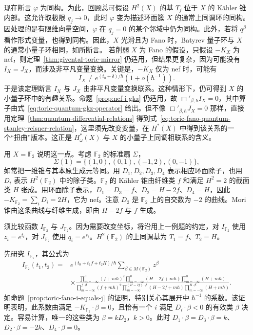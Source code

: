 \begin{example}
现在断言 $\varphi$ 为同构。为此，回顾总可假设 $H^2(X)$ 的基 $T_j$ 位于 $X$ 的 Kähler 锥内部。这允许取极限 $q_j\to0$，此时 $\varphi$ 变为描述环面簇 $X$ 的通常上同调环的同构。因处理的是有限维向量空间，$\varphi$ 在 $q_j=0$ 的某个邻域中仍为同构。此外，若将 $q^\beta$ 看作形式变量，也得到同构。因此，$X$ 光滑且为 Fano 时，Batyrev 量子环与 $X$ 的通常小量子环相同，如所断言。
若削弱 $X$ 为 Fano 的假设，只假设 $-K_X$ 为 nef，则定理~\ref{thm:givental-toric-mirror} 仍适用，但结果更复杂，因为可能没有 $I_X=J_X$，而涉及非平凡变量变换。关键是，$-K_X$ 仅为 nef 时，可能有
\[
I_X\ne e^{(t_0+\delta)/\hbar}(1+o(\hbar^{-1})).
\]
于是该定理断言 $I_X$ 与 $J_X$ 由非平凡变量变换联系。这种情形下，仍可得到 $X$ 的小量子环中的有趣关系。命题~\ref{prop:nef-i-gkz} 仍适用，故 $\Box'_{\beta,\hbar}I_X=0$，其中算子由式~\eqref{eq:toric-quantum-gkz-operator} 给出。但不像 $\Box'_{\beta,\hbar}J_X=0$ 那样，直接用定理~\ref{thm:quantum-differential-relations} 得到式~\eqref{eq:toric-fano-quantum-stanley-reisner-relation}，这里须先改变变量，在 $H^*(X)$ 中得到该关系的一个“扭曲”版本。这正是 $H_\omega^*(X)$ 与 $X$ 的小量子上同调相联系的含义。

\begingroup\linespread{1.18}\selectfont
用 $X=\mathbb F_2$ 说明这一点。考虑 $\mathbb F_2$ 的标准扇 $\Sigma$，
\[
\Sigma(1)=\{(1,0),(0,1),(-1,2),(0,-1)\},
\]
如常把一维锥与其本原生成元等同。用 $D_1,D_2,D_3,D_4$ 表示相应环面除子，也用 $D_i$ 表示 $H^2(\mathbb F_2)$ 中的除子类。$\mathbb F_2$ 的 Kähler 锥由纤维类 $f$ 和满足 $H^2=2$ 的截面类 $H$ 张成。用环面除子表示，$D_1=D_3=f$、$D_2=H-2f$、$D_4=H$，因此 $-K_{\mathbb F_2}=\sum_iD_i=2H$，它为 nef。注意 $D_2$ 是 $\mathbb F_2$ 上的自交数为 $-2$ 的曲线。Mori 锥由这条曲线与纤维生成，即由 $H-2f$ 与 $f$ 生成。

须比较函数 $I_{\mathbb F_2}$ 与 $J_{\mathbb F_2}$。因为需要改变坐标，将沿用上一例题的约定，对 $I_{\mathbb F_2}$ 使用 $z_i=e^{t_i}$，对 $J_{\mathbb F_2}$ 使用 $q_i=e^{s_i}$。$H^2(\mathbb F_2)$ 的上同调基为 $T_1=f$、$T_2=H$。

先研究 $I_{\mathbb F_2}$，其公式为
\[
\begin{aligned}
I_{\mathbb F_2}(t_1,t_2)={}&e^{(t_0+t_1f+t_2H)/\hbar}\sum_{\beta\in M(\mathbb F_2)}z^\beta\\
&\times\frac{\prod_{m=-\infty}^0(f+m\hbar)^2\prod_{m=-\infty}^0(H-2f+m\hbar)\prod_{m=-\infty}^0(H+m\hbar)}{\prod_{m=-\infty}^{f\cdot\beta}(f+m\hbar)^2\prod_{m=-\infty}^{(H-2f)\cdot\beta}(H-2f+m\hbar)\prod_{m=-\infty}^{H\cdot\beta}(H+m\hbar)}.
\end{aligned}
\]
如命题~\ref{prop:toric-fano-i-equals-j} 的证明，特别关心其展开中 $\hbar^{-1}$ 的系数。该证明表明，此系数由满足 $-K_{\mathbb F_2}\cdot\beta=0$，且恰有一个 $i$ 满足 $D_i\cdot\beta<0$ 的有效类 $\beta$ 决定。容易计算，唯一的这些类为 $\beta=kD_2$，$k>0$。此时 $D_1\cdot\beta=D_3\cdot\beta=k$、$D_2\cdot\beta=-2k$、$D_4\cdot\beta=0$。


\end{example}

